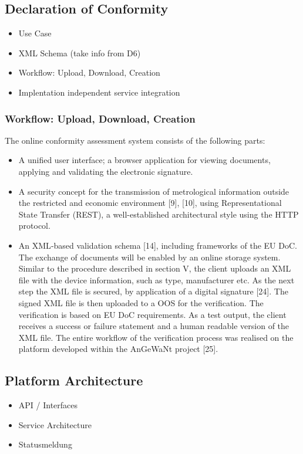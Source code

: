 \documentclass[3p,times,procedia]{elsarticle}
\begin{document}
\subsection{Declaration of Conformity}

\begin{itemize}
    \item Use Case
    \item XML Schema (take info from D6)
    \item Workflow: Upload, Download, Creation
    \item Implentation independent service integration
\end{itemize}

\subsubsection{Workflow: Upload, Download, Creation}
The online conformity assessment system consists of the following parts:
\begin{itemize}
    
\item A unified user interface; a browser application for viewing documents, applying and validating the electronic signature.
\item A security concept for the transmission of metrological information outside the restricted and economic environment [9], [10], using Representational State Transfer (REST), a well-established architectural style using the HTTP protocol.
\item An XML‐based validation schema [14], including frameworks of the EU DoC. The exchange of documents will be enabled by an online storage system. 
Similar to the procedure described in section V, the client uploads an XML file with the device information, such as type, manufacturer etc. As the next step the XML file is secured, by application of a digital signature [24]. The signed XML file is then uploaded to a OOS for the verification. The verification is based on EU DoC requirements. As a test output, the client receives a success or failure statement and a human readable version of the XML file. The entire workflow of the verification process was realised on the platform developed within the AnGeWaNt project [25].
\end{itemize}

\subsection{Platform Architecture}
\begin{itemize}
    \item API / Interfaces 
    \item Service Architecture 
    \item Statusmeldung
\end{itemize}
\end{document}
